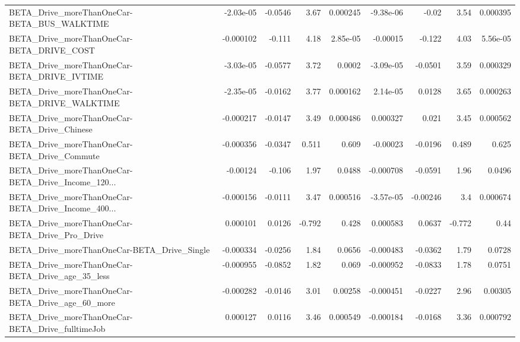\begin{tabular}{lrrrrrrrr}
BETA\_Drive\_moreThanOneCar-BETA\_BUS\_WALKTIME        &   -2.03e-05 &      -0.0546 &      3.67 & 0.000245 &  -9.38e-06 &       -0.02 &         3.54 &      0.000395 \\
BETA\_Drive\_moreThanOneCar-BETA\_DRIVE\_COST          &   -0.000102 &       -0.111 &      4.18 & 2.85e-05 &   -0.00015 &      -0.122 &         4.03 &      5.56e-05 \\
BETA\_Drive\_moreThanOneCar-BETA\_DRIVE\_IVTIME        &   -3.03e-05 &      -0.0577 &      3.72 &   0.0002 &  -3.09e-05 &     -0.0501 &         3.59 &      0.000329 \\
BETA\_Drive\_moreThanOneCar-BETA\_DRIVE\_WALKTIME      &   -2.35e-05 &      -0.0162 &      3.77 & 0.000162 &   2.14e-05 &      0.0128 &         3.65 &      0.000263 \\
BETA\_Drive\_moreThanOneCar-BETA\_Drive\_Chinese       &   -0.000217 &      -0.0147 &      3.49 & 0.000486 &   0.000327 &       0.021 &         3.45 &      0.000562 \\
BETA\_Drive\_moreThanOneCar-BETA\_Drive\_Commute       &   -0.000356 &      -0.0347 &     0.511 &    0.609 &   -0.00023 &     -0.0196 &        0.489 &         0.625 \\
BETA\_Drive\_moreThanOneCar-BETA\_Drive\_Income\_120... &    -0.00124 &       -0.106 &      1.97 &   0.0488 &  -0.000708 &     -0.0591 &         1.96 &        0.0496 \\
BETA\_Drive\_moreThanOneCar-BETA\_Drive\_Income\_400... &   -0.000156 &      -0.0111 &      3.47 & 0.000516 &  -3.57e-05 &    -0.00246 &          3.4 &      0.000674 \\
BETA\_Drive\_moreThanOneCar-BETA\_Drive\_Pro\_Drive     &    0.000101 &       0.0126 &    -0.792 &    0.428 &   0.000583 &      0.0637 &       -0.772 &          0.44 \\
BETA\_Drive\_moreThanOneCar-BETA\_Drive\_Single        &   -0.000334 &      -0.0256 &      1.84 &   0.0656 &  -0.000483 &     -0.0362 &         1.79 &        0.0728 \\
BETA\_Drive\_moreThanOneCar-BETA\_Drive\_age\_35\_less   &   -0.000955 &      -0.0852 &      1.82 &    0.069 &  -0.000952 &     -0.0833 &         1.78 &        0.0751 \\
BETA\_Drive\_moreThanOneCar-BETA\_Drive\_age\_60\_more   &   -0.000282 &      -0.0146 &      3.01 &  0.00258 &  -0.000451 &     -0.0227 &         2.96 &       0.00305 \\
BETA\_Drive\_moreThanOneCar-BETA\_Drive\_fulltimeJob   &    0.000127 &       0.0116 &      3.46 & 0.000549 &  -0.000184 &     -0.0168 &         3.36 &      0.000792 \\

\end{tabular}
